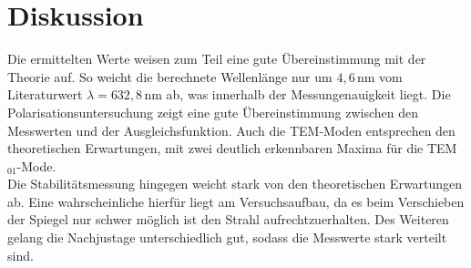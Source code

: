 \section{Diskussion}
Die ermittelten Werte weisen zum Teil eine gute Übereinstimmung mit der Theorie auf. So weicht die berechnete Wellenlänge nur um $4,6\,\si{\nano\meter}$ vom Literaturwert
$\lambda=632,8\,\si{\nano\meter}$ \cite{anleitung} ab, was innerhalb der Messungenauigkeit liegt. Die Polarisationsuntersuchung zeigt eine gute Übereinstimmung zwischen
den Messwerten und der Ausgleichsfunktion. Auch die TEM-Moden entsprechen den theoretischen Erwartungen, mit zwei deutlich erkennbaren Maxima für die TEM$_{01}$-Mode.\\
Die Stabilitätsmessung hingegen weicht stark von den theoretischen Erwartungen ab. Eine wahrscheinliche hierfür
liegt am Versuchsaufbau, da es beim Verschieben der Spiegel nur schwer möglich ist den Strahl aufrechtzuerhalten. Des Weiteren gelang die Nachjustage unterschiedlich gut,
sodass die Messwerte stark verteilt sind.

